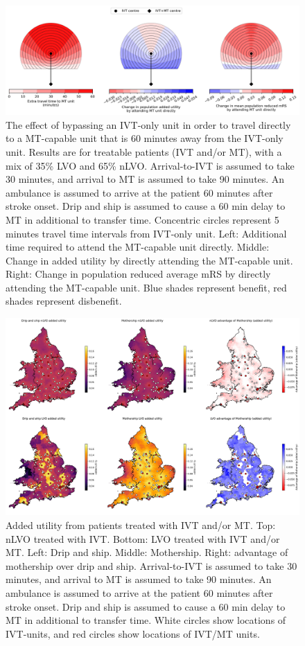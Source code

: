 \begin{figure}
\centering
\includegraphics[width=1.0\textwidth]{./images/circle_plots_t-IVT-to-MT=60_t-onset-to-ambo=60}
\caption{The effect of bypassing an IVT-only unit in order to travel directly to a MT-capable unit that is 60 minutes away from the IVT-only unit. Results are for treatable patients (IVT and/or MT), with a mix of 35\% LVO and 65\% nLVO. Arrival-to-IVT is assumed to take 30 minutes, and arrival to MT is assumed to take 90 minutes. An ambulance is assumed to arrive at the patient 60 minutes after stroke onset. Drip and ship is assumed to cause a 60 min delay to MT in additional to transfer time. Concentric circles represent 5 minutes travel time intervals from IVT-only unit. Left: Additional time required to attend the MT-capable unit  directly. Middle: Change in added utility by directly attending the MT-capable unit. Right: Change in population reduced average mRS by directly attending the MT-capable unit. Blue shades represent benefit, red shades represent disbenefit.}
\label{fig:added_utility_six_in_one}
\end{figure}

\begin{figure}
\centering
\includegraphics[width=1.0\textwidth]{./maps/added_utility_six_in_one}
\caption{Added utility from patients treated with IVT and/or MT. Top: nLVO treated with IVT. Bottom: LVO treated with IVT and/or MT. Left: Drip and ship. Middle: Mothership. Right: advantage of mothership over drip and ship. Arrival-to-IVT is assumed to take 30 minutes, and arrival to MT is assumed to take 90 minutes. An ambulance is assumed to arrive at the patient 60 minutes after stroke onset. Drip and ship is assumed to cause a 60 min delay to MT in additional to transfer time. White circles show locations of IVT-units, and red circles show locations of IVT/MT units.}
\label{fig:added_utility_six_in_one}
\end{figure}

